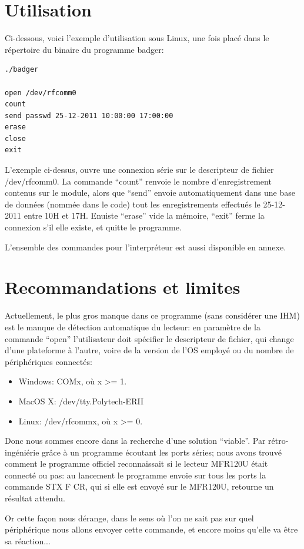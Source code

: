     \section{Utilisation}

Ci-dessous, voici l'exemple d'utilisation sous Linux, une fois placé dans le
répertoire du binaire du programme badger:

    \begin{lstlisting}
./badger

open /dev/rfcomm0
count
send passwd 25-12-2011 10:00:00 17:00:00
erase
close
exit
    \end{lstlisting}

L'exemple ci-dessus, ouvre une connexion série sur le descripteur de fichier
/dev/rfcomm0. La commande ``count'' renvoie le nombre d'enregistrement contenus sur 
le module, alors que ``send'' envoie automatiquement dans une base de données (nommée
dans le code) tout les enregistrements effectués le 25-12-2011 entre 10H et 17H.
Enuiste ``erase'' vide la mémoire, ``exit'' ferme la connexion s'il elle existe, et
quitte le programme.

L'ensemble des commandes pour l'interpréteur est aussi disponible en annexe.

    \section{Recommandations et limites}

Actuellement, le plus gros manque dans ce programme (sans considérer une IHM) est
le manque de détection automatique du lecteur: en paramètre de la commande ``open''
l'utilisateur doit spécifier le descripteur de fichier, qui change d'une plateforme
à l'autre, voire de la version de l'OS employé ou du nombre de périphériques connectés:

    \begin{itemize}
    \item Windows: COMx, où x >= 1.
    \item MacOS X: /dev/tty.Polytech-ERII
    \item Linux: /dev/rfcommx, où x >= 0.
    \end{itemize}

Donc nous sommes encore dans la recherche d'une solution ``viable''. Par
rétro-ingéniérie grâce à un programme écoutant les ports séries; nous avons
trouvé comment le programme officiel reconnaissait si le lecteur MFR120U était 
connecté ou pas: au lancement le programme envoie sur tous les ports la commande
STX F CR, qui si elle est envoyé sur le MFR120U, retourne un résultat attendu.

Or cette façon nous dérange, dans le sens où l'on ne sait pas sur quel périphérique
nous allons envoyer cette commande, et encore moins qu'elle va être sa réaction...
